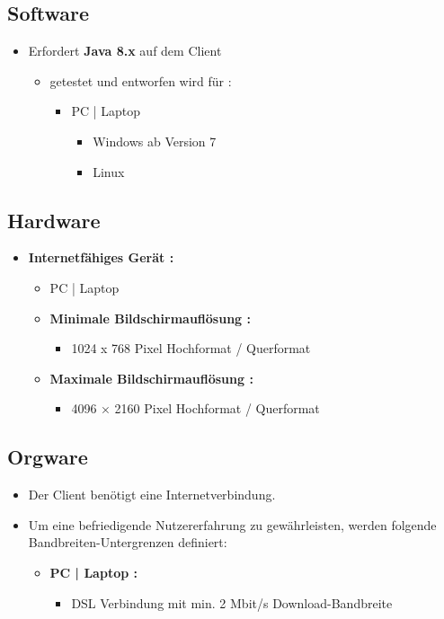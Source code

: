 	\subsection{Software}
	\begin{itemize}
		\item Erfordert \textbf{Java 8.x} auf dem Client
		\begin{itemize}
			\item getestet und entworfen wird für :
			\begin{itemize}
				\item PC | Laptop
				\begin{itemize}
					\item Windows ab Version 7
					\item Linux
				\end{itemize}
			\end{itemize}
		\end{itemize}
	\end{itemize}
	\subsection{Hardware}
	\begin{itemize}
		\item \textbf{Internetfähiges Gerät :}
		\begin{itemize}
			\item PC | Laptop
			\item \textbf{Minimale Bildschirmauflösung :}
				\begin{itemize}
					\item 1024 x 768 Pixel Hochformat / Querformat
				\end{itemize}
					\item \textbf{Maximale Bildschirmauflösung :}
				\begin{itemize}
				\item 4096 × 2160 Pixel Hochformat / Querformat
				\end{itemize}		
		\end{itemize}
	\end{itemize}
	\subsection{Orgware}
	\begin{itemize}
		\item Der Client benötigt eine Internetverbindung.
		\item Um eine befriedigende Nutzererfahrung zu gewährleisten, werden folgende Bandbreiten-Untergrenzen definiert:
		\begin{itemize}
			\item \textbf{ PC | Laptop :}
			\begin{itemize}
				\item DSL Verbindung mit min. 2 Mbit/s Download-Bandbreite
			\end{itemize}
		\end{itemize}
	\end{itemize}	
